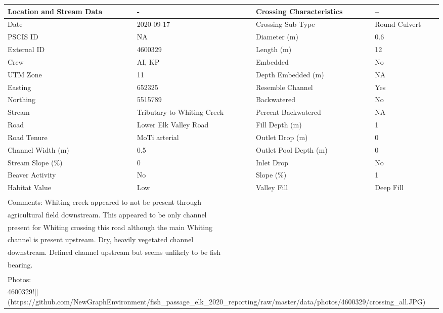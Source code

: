 \documentclass[
]{book}
\begin{document}
\begin{tabular}{l|l|l|l}
\hline
Location and Stream Data & - & Crossing Characteristics & --\\
\hline
Date & 2020-09-17 & Crossing Sub Type & Round Culvert\\
\hline
PSCIS ID & NA & Diameter (m) & 0.6\\
\hline
External ID & 4600329 & Length (m) & 12\\
\hline
Crew & AI, KP & Embedded & No\\
\hline
UTM Zone & 11 & Depth Embedded (m) & NA\\
\hline
Easting & 652325 & Resemble Channel & Yes\\
\hline
Northing & 5515789 & Backwatered & No\\
\hline
Stream & Tributary to Whiting Creek & Percent Backwatered & NA\\
\hline
Road & Lower Elk Valley Road & Fill Depth (m) & 1\\
\hline
Road Tenure & MoTi arterial & Outlet Drop (m) & 0\\
\hline
Channel Width (m) & 0.5 & Outlet Pool Depth (m) & 0\\
\hline
Stream Slope (\%) & 0 & Inlet Drop & No\\
\hline
Beaver Activity & No & Slope (\%) & 1\\
\hline
Habitat Value & Low & Valley Fill & Deep Fill\\
\hline
\multicolumn{4}{l}{\textsuperscript{} Comments: Whiting creek appeared to not be present through}\\
\multicolumn{4}{l}{agricultural field downstream. This appeared to be only channel}\\
\multicolumn{4}{l}{present for Whiting crossing this road although the main Whiting}\\
\multicolumn{4}{l}{channel is present upstream. Dry, heavily vegetated channel}\\
\multicolumn{4}{l}{downstream. Defined channel upstream but seems unlikely to be fish}\\
\multicolumn{4}{l}{bearing.}\\
\multicolumn{4}{l}{\textsuperscript{} Photos:}\\
\multicolumn{4}{l}{4600329![](https://github.com/NewGraphEnvironment/fish\_passage\_elk\_2020\_reporting/raw/master/data/photos/4600329/crossing\_all.JPG)}\\
\end{tabular}
\end{document}
